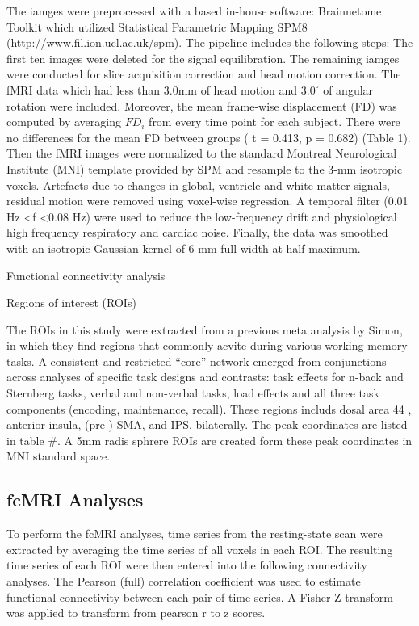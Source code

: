 \documentclass[preprint,authoryear,review,12pt,times]{elsarticle}
\begin{document}

The iamges were preprocessed with a based in-house software: Brainnetome Toolkit which utilized Statistical Parametric Mapping SPM8 (\url{http://www.fil.ion.ucl.ac.uk/spm}). The pipeline includes the following steps: The first ten images were deleted for the signal equilibration. The remaining iamges were conducted for slice acquisition correction and head motion correction.  The fMRI data which had
less than 3.0mm of head motion and $3.0^{\circ}$ of angular rotation were included.  Moreover, the mean frame-wise displacement (FD) was computed by averaging \(FD_{i}\) from every time point for each subject. There were no differences for the mean FD between groups ( t = 0.413, p = 0.682) (Table 1). Then the fMRI images were normalized to the standard Montreal Neurological Institute (MNI) template provided by SPM and resample to the 3-mm isotropic voxels. Artefacts due to changes in global, ventricle and white matter signals, residual motion were removed using voxel-wise regression. A temporal filter (0.01 Hz \textless f \textless 0.08 Hz) were used to reduce the low-frequency drift and physiological high frequency respiratory and cardiac noise. Finally, the data was smoothed with an isotropic Gaussian kernel of 6 mm full-width at half-maximum. 

Functional connectivity analysis

Regions of interest (ROIs)

The ROIs in this study were extracted from a previous meta analysis by Simon, in which they find regions that commonly acvite during various working memory tasks. A consistent and restricted ``core'' network emerged from conjunctions across analyses of specific task designs and contrasts: task effects for n-back and Sternberg tasks, verbal and non-verbal tasks, load effects and all three task components (encoding, maintenance, recall). These regions includs dosal area 44 , anterior insula, (pre-) SMA, and IPS, bilaterally. The peak coordinates are listed in table \#. A 5mm radis sphrere ROIs are created form these peak coordinates in MNI standard space.

\subsection*{fcMRI Analyses}

To perform the fcMRI analyses, time series from the resting-state scan were extracted by averaging the time series of all voxels in each ROI. The resulting time series of each ROI were then entered into the following connectivity analyses. The Pearson (full) correlation coefficient was used to estimate functional connectivity between each pair of time series. A Fisher Z transform was applied to transform from pearson r to z scores.
\end{document}
